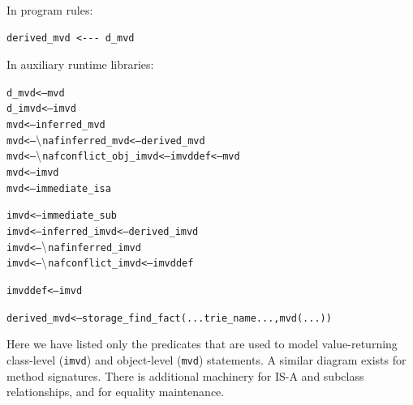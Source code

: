 \documentclass[11pt]{article}
\newcommand{\RULELOGNAF}{{\texttt{\ensuremath{\tt\backslash}naf}}\xspace}
\begin{document}
\noindent
In program rules:
\begin{verbatim}
derived_mvd <--- d_mvd  
\end{verbatim}
\noindent
In auxiliary runtime libraries:
\begin{alltt}
d_mvd  <---  mvd
d_imvd <--- imvd
          mvd <---      inferred_mvd
          mvd <--- \RULELOGNAF inferred_mvd        <--- derived_mvd
          mvd <--- \RULELOGNAF conflict_obj_imvd   <--- imvddef <--- mvd
          mvd <---      imvd
          mvd <---      immediate_isa

         imvd <---      immediate_sub
         imvd <---      inferred_imvd             <--- derived_imvd
         imvd <--- \RULELOGNAF inferred_imvd
         imvd <--- \RULELOGNAF conflict_imvd      <--- imvddef

      imvddef <---      imvd

  derived_mvd <--- storage_find_fact(...trie_name..., mvd(...))
\end{alltt}
Here we have listed only the predicates that are used to model value-returning
class-level ({\tt imvd}) and object-level ({\tt mvd}) statements.  A similar
diagram exists for
method signatures. There is additional machinery for
IS-A and subclass relationships, and for equality maintenance.
\end{document}
